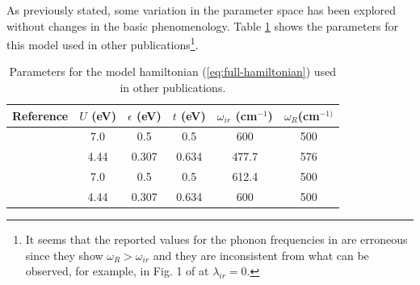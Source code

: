As previously stated, some variation in the parameter space has been explored without changes in the basic phenomenology. Table \ref{tab:parameters} shows the parameters for this model used in other publications\footnote{It seems that the reported values for the phonon frequencies in \cite{Salkola1994, Salkola1995} are erroneous since they show $\omega_R > \omega_{ir}$ and they are inconsistent from what can be observed, for example, in Fig. 1 of \cite{Salkola1994} at $\lambda_{ir}=0$.}.

\begin{table}[h]
  \centering
  \begin{tabular}[h]{| l | c | c | c | c | c |}
    \hline
    Reference & $U$ (eV) & $\epsilon$ (eV) & $t$ (eV) & $\omega_{ir}$ (cm$^{-1}$) & $\omega_R$(cm$^{-1)}$ \\
    \hline
    \cite{MustredeLeon1992} & 7.0 & 0.5 & 0.5 & 600 & 500 \\ 
    \cite{Salkola1994, Salkola1995} & 4.44 & 0.307 & 0.634 & 477.7 & 576  \\
    \cite{DeLeon1999, Leon2008, MirandaMena2007,Mena2006} & 7.0 & 0.5 & 0.5 & 612.4 & 500 \\ 
    \cite{MustredeLeon2000} & 4.44 & 0.307 & 0.634 & 600 & 500 \\
    \hline
  \end{tabular}
  \caption{Parameters for the model hamiltonian (\ref{eq:full-hamiltonian}) used in other publications.}
  \label{tab:parameters}
\end{table}
